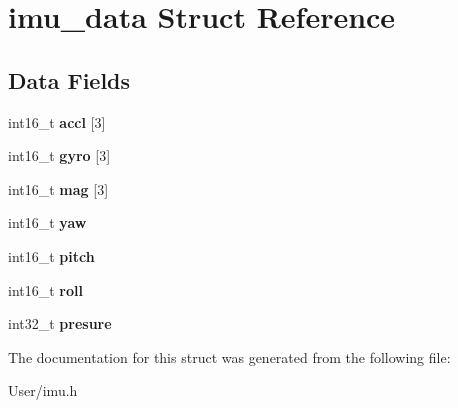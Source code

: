 \hypertarget{structimu__data}{}\section{imu\+\_\+data Struct Reference}
\label{structimu__data}
\subsection*{Data Fields}
\begin{DoxyCompactItemize}
\item 
\hypertarget{structimu__data_a57aa303c7ed2cb34c16497a5e8a9053d}{}int16\+\_\+t {\bfseries accl} \mbox{[}3\mbox{]}\label{structimu__data_a57aa303c7ed2cb34c16497a5e8a9053d}

\item 
\hypertarget{structimu__data_a4bc4a4dafbf111b0cf5f6122ca746e85}{}int16\+\_\+t {\bfseries gyro} \mbox{[}3\mbox{]}\label{structimu__data_a4bc4a4dafbf111b0cf5f6122ca746e85}

\item 
\hypertarget{structimu__data_aa7a5efa29812f939ef282ef377e50cb4}{}int16\+\_\+t {\bfseries mag} \mbox{[}3\mbox{]}\label{structimu__data_aa7a5efa29812f939ef282ef377e50cb4}

\item 
\hypertarget{structimu__data_ad9679e37cfd53ac65eaf76de1951c753}{}int16\+\_\+t {\bfseries yaw}\label{structimu__data_ad9679e37cfd53ac65eaf76de1951c753}

\item 
\hypertarget{structimu__data_a967f06d969d74c7588755b6bc82575c5}{}int16\+\_\+t {\bfseries pitch}\label{structimu__data_a967f06d969d74c7588755b6bc82575c5}

\item 
\hypertarget{structimu__data_ac1c338715ac9be841d38bed1aa0c9cd6}{}int16\+\_\+t {\bfseries roll}\label{structimu__data_ac1c338715ac9be841d38bed1aa0c9cd6}

\item 
\hypertarget{structimu__data_a93bafabb13c0568122061c6ae7b18754}{}int32\+\_\+t {\bfseries presure}\label{structimu__data_a93bafabb13c0568122061c6ae7b18754}

\end{DoxyCompactItemize}


The documentation for this struct was generated from the following file\+:\begin{DoxyCompactItemize}
\item 
User/imu.\+h\end{DoxyCompactItemize}
